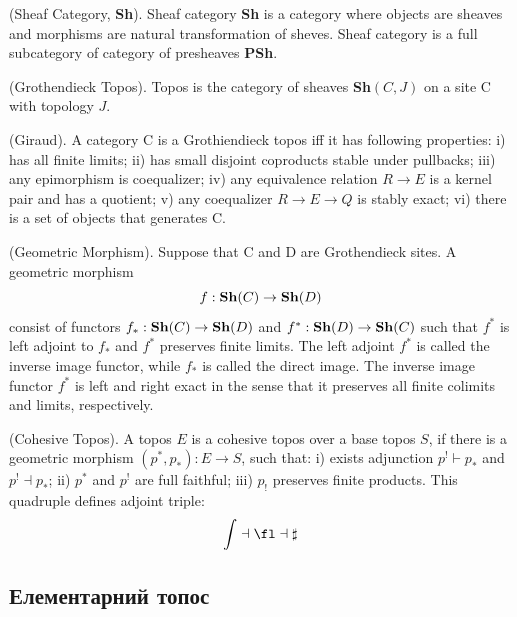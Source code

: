 \begin{definition} (Sheaf Category, {\bf Sh}).
Sheaf category {\bf Sh}
is a category where objects are sheaves and morphisms are
natural transformation of sheves. Sheaf category is a full subcategory
of category of presheaves {\bf PSh}.
\end{definition}

\begin{definition} (Grothendieck Topos).
Topos is the category of sheaves {\bf Sh}$(C,J)$ on a site $\mathrm{C}$ with topology $J$.
\end{definition}

\begin{theorem} (Giraud).
A category $\mathrm{C}$ is a Grothiendieck topos iff it has following properties:
i) has all finite limits;
ii) has small disjoint coproducts stable under pullbacks;
iii) any epimorphism is coequalizer;
iv) any equivalence relation $R \rightarrow E$ is a kernel pair and has a quotient;
v) any coequalizer $R \rightarrow E \rightarrow Q$ is stably exact;
vi) there is a set of objects that generates $\mathrm{C}$.
\end{theorem}

\begin{definition} (Geometric Morphism). Suppose that $\mathrm{C}$ and $\mathrm{D}$
are Grothendieck sites. A geometric morphism
$$
    f : {\bf Sh}(C) \rightarrow {\bf Sh}(D)
$$
consist of functors $f_* : {\bf Sh}(C) \rightarrow {\bf Sh}(D)$ and
$f^* : {\bf Sh}(D) \rightarrow {\bf Sh}(C)$ such that $f^*$ is
left adjoint to $f_*$ and $f^*$ preserves finite limits. The left adjoint $f^*$ is called
the inverse image functor, while $f_*$ is called the direct image. The inverse image functor
$f^*$ is left and right exact in the sense that it preserves all finite
colimits and limits, respectively.
\end{definition}

\begin{definition} (Cohesive Topos). A topos $E$ is a cohesive topos over a base topos $S$,
if there is a geometric morphism $(p^*,p_*): E \rightarrow S$, such that:
i) exists adjunction $p^! \vdash p_*$ and $ p^! \dashv p_*$;
ii) $p^*$ and $p^!$ are full faithful; iii) $p_!$ preserves finite products.
This quadruple defines adjoint triple:
$$
\int \dashv \fl \dashv \sharp
$$
\end{definition}

\subsection{Елементарний топос}

